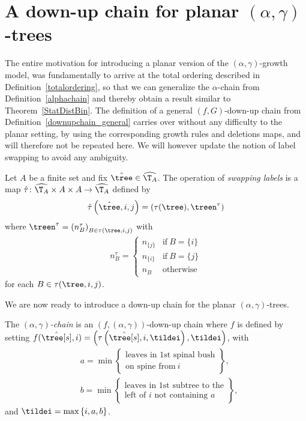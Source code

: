 \section{A down-up chain for planar $(\alpha, \gamma)$-trees}
%
The entire motivation for introducing a planar version of the $(\alpha, \gamma)$-growth model, was fundamentally to arrive at the total ordering described in Definition~\ref{totalordering}, so that we can generalize the $\alpha$-chain from Definition~\ref{alphachain} and thereby obtain a result similar to Theorem~\ref{StatDistBin}.
The definition of a general $(f, G)$-down-up chain from Definition~\ref{downupchain_general} carries over without any difficulty to the planar setting, by using the corresponding growth rules and deletions maps, and will therefore not be repeated here.
We will however update the notion of label swapping to avoid any ambiguity.
%
\begin{defi}\label{labelswappingplanar}
  Let $A$ be a finite set and fix $\hat{\tree} \in \widehat{\T_A}$.
  The operation of \textit{swapping labels} is a map $\hat{\tau} \colon \widehat{\T_A} \times A \times A \to \widehat{\T_A}$ defined by
  \begin{align*}
  \hat{\tau} \left( \hat{\tree}, i, j \right)
  = \left( \tau(\tree), \treen^\tau \right)
  \end{align*}
  where $\treen^\tau = {\left( n_B^\tau \right)}_{B \in \tau(\tree, i, j)}$ with
  \begin{align}
    n_B^\tau
    =
    \begin{cases}
      n_{\{j\}} & \text{if}\ B = \{i\} \\
      n_{\{i\}} & \text{if}\ B = \{j\} \\
      n_B & \text{otherwise}
    \end{cases}
    \label{labelswappingnumbers}
  \end{align}
  for each $B \in \tau(\tree, i, j)$.
\end{defi}
%
We are now ready to introduce a down-up chain for the planar $(\alpha, \gamma)$-trees.
%
%
\begin{defi}
  The \textit{$(\alpha, \gamma)$-chain} is an $(f, (\alpha, \gamma))$-down-up chain where $f$ is defined by setting $f(\hat{\tree[s]}, i) = \left( \tau\left( \hat{\tree[s]}, i, \tildei \right), \tildei \right)$, with
  \begin{align}
    &a = \min
    \begin{Bmatrix}
      \text{leaves in 1st spinal bush} \\ \text{on spine from}\ i
    \end{Bmatrix}, \\
    &b = \min
    \begin{Bmatrix}
      \text{leaves in 1st subtree to the} \\ \text{left of $i$ not containing $a$}
    \end{Bmatrix},
    \label{searchplanar}
  \end{align}
  and $\tildei = \max \left\{ i, a, b \right\}$.
\end{defi}
